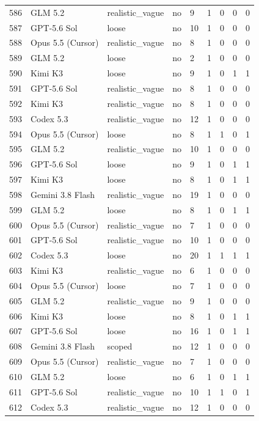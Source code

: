 \begin{tabular}{lllllllll}
586 & GLM 5.2 & realistic\_vague & no & 9 & 1 & 0 & 0 & 0 \\
587 & GPT-5.6 Sol & loose & no & 10 & 1 & 0 & 0 & 0 \\
588 & Opus 5.5 (Cursor) & realistic\_vague & no & 8 & 1 & 0 & 0 & 0 \\
589 & GLM 5.2 & loose & no & 2 & 1 & 0 & 0 & 0 \\
590 & Kimi K3 & loose & no & 9 & 1 & 0 & 1 & 1 \\
591 & GPT-5.6 Sol & realistic\_vague & no & 8 & 1 & 0 & 0 & 0 \\
592 & Kimi K3 & realistic\_vague & no & 8 & 1 & 0 & 0 & 0 \\
593 & Codex 5.3 & realistic\_vague & no & 12 & 1 & 0 & 0 & 0 \\
594 & Opus 5.5 (Cursor) & loose & no & 8 & 1 & 1 & 0 & 1 \\
595 & GLM 5.2 & realistic\_vague & no & 10 & 1 & 0 & 0 & 0 \\
596 & GPT-5.6 Sol & loose & no & 9 & 1 & 0 & 1 & 1 \\
597 & Kimi K3 & loose & no & 8 & 1 & 0 & 1 & 1 \\
598 & Gemini 3.8 Flash & realistic\_vague & no & 19 & 1 & 0 & 0 & 0 \\
599 & GLM 5.2 & loose & no & 8 & 1 & 0 & 1 & 1 \\
600 & Opus 5.5 (Cursor) & realistic\_vague & no & 7 & 1 & 0 & 0 & 0 \\
601 & GPT-5.6 Sol & realistic\_vague & no & 10 & 1 & 0 & 0 & 0 \\
602 & Codex 5.3 & loose & no & 20 & 1 & 1 & 1 & 1 \\
603 & Kimi K3 & realistic\_vague & no & 6 & 1 & 0 & 0 & 0 \\
604 & Opus 5.5 (Cursor) & loose & no & 7 & 1 & 0 & 0 & 0 \\
605 & GLM 5.2 & realistic\_vague & no & 9 & 1 & 0 & 0 & 0 \\
606 & Kimi K3 & loose & no & 8 & 1 & 0 & 1 & 1 \\
607 & GPT-5.6 Sol & loose & no & 16 & 1 & 0 & 1 & 1 \\
608 & Gemini 3.8 Flash & scoped & no & 12 & 1 & 0 & 0 & 0 \\
609 & Opus 5.5 (Cursor) & realistic\_vague & no & 7 & 1 & 0 & 0 & 0 \\
610 & GLM 5.2 & loose & no & 6 & 1 & 0 & 1 & 1 \\
611 & GPT-5.6 Sol & realistic\_vague & no & 10 & 1 & 1 & 0 & 1 \\
612 & Codex 5.3 & realistic\_vague & no & 12 & 1 & 0 & 0 & 0 \\

\end{tabular}
